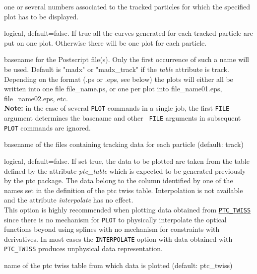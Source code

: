 \begin{madlist}
    one or several numbers associated to the tracked
     particles for which the specified plot has to be displayed.  

    logical, default=false. If true all the curves
     generated for each tracked particle are put on one plot. Otherwise
     there will be one plot for each particle.   

    basename for the Postscript
     file(s). Only the first occurrence of such a name will be
     used. Default is "madx" or "madx\_track" if the \textit{table}
     attribute is track.  Depending on the format (.ps or .eps, see
     below) the plots will either all be written into one file
     file\_name.ps, or one per plot into file\_name01.eps,
     file\_name02.eps, etc. \\
     {\bf Note:} in the case of several {\tt PLOT} commands in a single \madx 
     job, the first {\tt FILE} argument determines the basename and other {\tt 
     FILE} arguments in subsequent {\tt PLOT} commands are ignored.

    basename of the files containing
     tracking data for each particle (default: track)  

    logical, default=false. If set true, the data to be
     plotted are taken from the table defined by the attribute
     \textit{ptc\_table} which is expected to be generated previously by
     the ptc package. The data belong to the column identified by one of
     the names set in the definition of the ptc twiss
     table. Interpolation is not available and the attribute
     \textit{interpolate} has no effect. \\ 
     This option is highly recommended when plotting data obtained from
     \hyperref[chap:ptc_twiss]{\tt PTC\_TWISS} since there is no
     mechanism for {\tt PLOT} to physically interpolate the optical
     functions beyond using splines with no mechanism for constraints
     with derivatives. In most cases the {\tt INTERPOLATE} option with
     data obtained with {\tt PTC\_TWISS} produces unphysical data
     representation.

    name of the ptc twiss table from which data is
     plotted (default: ptc\_twiss)

\end{madlist}




